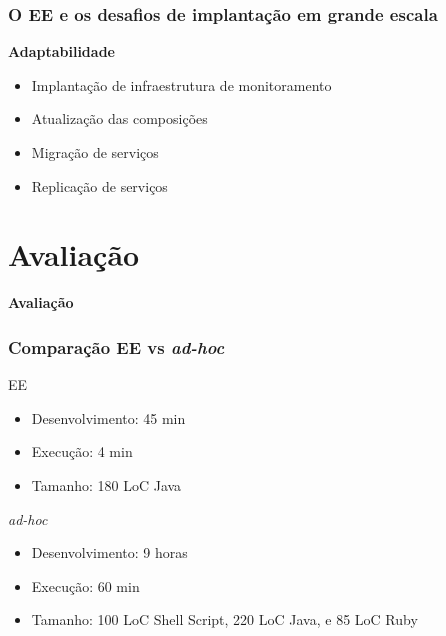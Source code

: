 \documentclass{beamer}
\newcommand\adhoc{\emph{ad-hoc}\xspace}
\newcommand\sectiontitle[1]{\begin{center}\huge\textbf{#1}\end{center}}
\newcommand\subtitulo[1]{{\large \textbf{#1}}}
\begin{document}

\begin{frame}
\frametitle{O EE e os desafios de implantação em grande escala}

\subtitulo{Adaptabilidade}

\vspace{1cm}

\begin{itemize}
\item Implantação de infraestrutura de monitoramento
\vspace{0.2cm}
\item Atualização das composições
\item Migração de serviços
\item Replicação de serviços
\end{itemize}

\end{frame}



\section{Avaliação}

\begin{frame}

\sectiontitle{Avaliação}

\end{frame}



\begin{frame}
\frametitle{Comparação EE vs \adhoc}

\begin{block}{EE}
\begin{itemize}
\item Desenvolvimento: 45 min
\item Execução: 4 min
\item Tamanho: 180 LoC Java
\end{itemize}
\end{block}

\vspace{0.6cm}

\begin{block}{\adhoc}
\begin{itemize}
\item Desenvolvimento: 9 horas
\item Execução: 60 min
\item Tamanho: 100 LoC Shell Script, 220 LoC Java, e 85 LoC Ruby
\end{itemize}
\end{block}

\end{frame}
\end{document}
